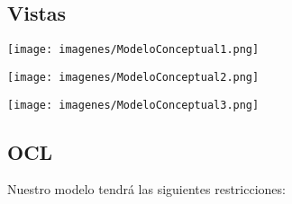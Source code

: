 \newpage
\subsection{Vistas}
\begin{center}
\texttt{[image: imagenes/ModeloConceptual1.png]}
\end{center}
\newpage
\begin{center}
\texttt{[image: imagenes/ModeloConceptual2.png]}
\end{center}
\newpage
\begin{center}
\texttt{[image: imagenes/ModeloConceptual3.png]}
\end{center}

\newpage
\subsection{OCL}
Nuestro modelo tendrá las siguientes restricciones:

